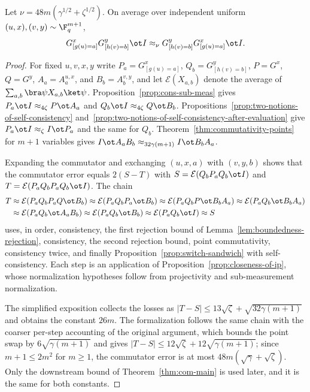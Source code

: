 \begin{lemma}\label{lem:comm-data-processed-g}
	\leanok
	Let $\nu=48m(\gamma^{1/2}+\zeta^{1/2})$.  On average over independent
	uniform $(u,x),(v,y)\sim\F_q^{m+1}$,
	\[
		G^x_{[g(u)=a]}G^y_{[h(v)=b]}\ot I\approx_\nu
		G^y_{[h(v)=b]}G^x_{[g(u)=a]}\ot I.
	\]
\end{lemma}
\begin{proof}
	\leanok
	For fixed $u,v,x,y$ write $P_a=G^x_{[g(u)=a]}$, $Q_b=G^y_{[h(v)=b]}$,
	$P=G^x$, $Q=G^y$, $A_a=A^{u,x}_a$, and $B_b=A^{v,y}_b$, and let
	$\mathcal E(X_{a,b})$ denote the average of
	$\sum_{a,b}\bra\psi X_{a,b}\ket\psi$.  Proposition~\ref{prop:cons-sub-meas}
	gives $P_a\ot I\approx_{4\zeta}P\ot A_a$ and
	$Q_b\ot I\approx_{4\zeta}Q\ot B_b$.
	Propositions~\ref{prop:two-notions-of-self-consistency}
	and~\ref{prop:two-notions-of-self-consistency-after-evaluation} give
	$P_a\ot I\approx_\zeta I\ot P_a$ and the same for $Q_b$.
	Theorem~\ref{thm:commutativity-points} for $m+1$ variables gives
	$I\ot A_aB_b\approx_{32\gamma(m+1)}I\ot B_bA_a$.

	Expanding the commutator and exchanging $(u,x,a)$ with $(v,y,b)$ shows
	that the commutator error equals $2(S-T)$ with
	$S=\mathcal E(Q_bP_aQ_b\ot I)$ and $T=\mathcal E(P_aQ_bP_aQ_b\ot I)$.
	The chain
	\begin{align*}
		T & \approx\mathcal E(P_aQ_bP_aQ\ot B_b)
		\approx\mathcal E(P_aQ_bP_a\ot B_b)
		\approx\mathcal E(P_aQ_bP\ot B_bA_a)
		\approx\mathcal E(P_aQ_b\ot B_bA_a)                            \\
		  & \approx\mathcal E(P_aQ_b\ot A_aB_b)
		\approx\mathcal E(P_aQ_b\ot B_b)
		\approx\mathcal E(P_aQ_b\ot I)\approx S
	\end{align*}
	uses, in order, consistency, the first rejection bound of
	Lemma~\ref{lem:boundedness-rejection}, consistency, the second rejection
	bound, point commutativity, consistency twice, and finally
	Proposition~\ref{prop:switch-sandwich} with self-consistency.  Each step
	is an application of Proposition~\ref{prop:closeness-of-ip}, whose
	normalization hypotheses follow from projectivity and sub-measurement
	normalization.

	The simplified exposition collects the losses as
	$|T-S|\le13\sqrt\zeta+\sqrt{32\gamma(m+1)}$ and obtains the constant
	$26m$.  The formalization follows the same chain with the coarser
	per-step accounting of the original argument, which bounds the point swap
	by $6\sqrt{\gamma(m+1)}$ and gives
	$|T-S|\le12\sqrt\zeta+12\sqrt{\gamma(m+1)}$; since $m+1\le2m^2$ for
	$m\ge1$, the commutator error is at most $48m(\sqrt\gamma+\sqrt\zeta)$.
	Only the downstream bound of Theorem~\ref{thm:com-main} is used later, and
	it is the same for both constants.
\end{proof}


